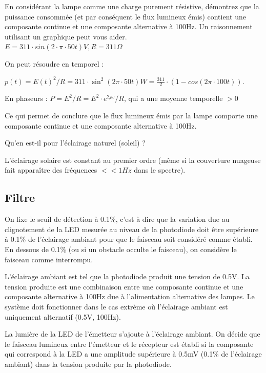 \documentclass{../template/tp}
\begin{document}
 \Question
 {
 En considérant la lampe comme une charge purement résistive, démontrez que la puissance consommée (et par conséquent le flux lumineux émis) contient une composante continue et une composante alternative à 100Hz. Un raisonnement utilisant un graphique peut vous aider.\\
 $E=311 \cdot sin(2\cdot\pi\cdot50t) V, R=311\Omega$

 }
 {%
 On peut résoudre en temporel :%
 
 $p(t)=E(t)^2/R=311\cdot\sin^2(2\pi\cdot50t) W=\frac{311}{2}\cdot(1-cos(2\pi\cdot100t))$.

En phaseurs :
 $P=E^2/R=E^2\cdot e^{2j\omega}/R$, qui a une moyenne temporelle $>0$

 Ce qui permet de conclure que le flux lumineux émis par la lampe comporte une composante continue et une composante alternative à 100Hz.
 }
\enlargethispage{0.5cm}
 \Question
 {
 Qu'en est-il pour l'éclairage naturel (soleil) ?

 }
 {%
 L'éclairage solaire est constant au premier ordre (même si la couverture nuageuse fait apparaître des fréquences $<<1Hz$ dans le spectre).
 }
 
\subsection{Filtre}
On fixe le seuil de détection à 0.1\%, c'est à dire que la variation due au clignotement de la LED mesurée au niveau de la photodiode doit être supérieure à 0.1\% de l'éclairage ambiant pour que le faisceau soit considéré comme établi. En dessous de 0.1\% (ou si un obstacle occulte le faisceau), on considère le faisceau comme interrompu.

L'éclairage ambiant est tel que la photodiode produit une tension de 0.5V. La tension produite est une combinaison entre une composante continue et une composante alternative à 100Hz due à l'alimentation alternative des lampes. Le système doit fonctionner dans le cas extrème où l'éclairage ambiant est uniquement alternatif (0.5V, 100Hz).

La lumière de la LED de l'émetteur s'ajoute à l'éclairage ambiant. On décide que le faisceau lumineux entre l'émetteur et le récepteur est établi si la composante qui correspond à la LED a une amplitude supérieure à 0.5mV (0.1\% de l'éclairage ambiant) dans la tension produite par la photodiode.
\end{document}
